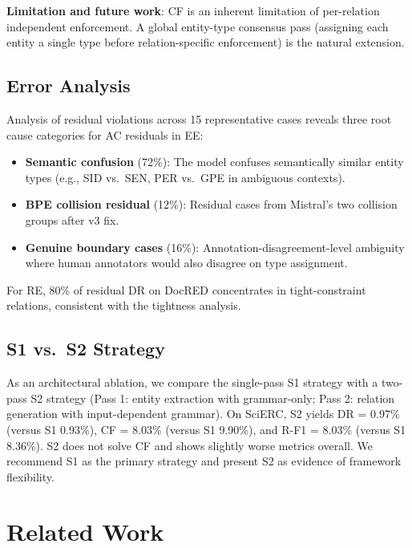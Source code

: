 \documentclass[11pt,a4paper]{article}
\newcommand{\drsym}{\textsc{DR}}
\newcommand{\cfsym}{\textsc{CF}}
\newcommand{\acsym}{\textsc{AC}}
\begin{document}
\textbf{Limitation and future work}: \cfsym{} is an inherent limitation of per-relation independent enforcement. A global entity-type consensus pass (assigning each entity a single type before relation-specific enforcement) is the natural extension.

\subsection{Error Analysis}

Analysis of residual violations across 15 representative cases reveals three root cause categories for \acsym{} residuals in EE:
\begin{itemize}[nosep,leftmargin=*]
\item \textbf{Semantic confusion} (72\%): The model confuses semantically similar entity types (e.g., SID vs.\ SEN, PER vs.\ GPE in ambiguous contexts).
\item \textbf{BPE collision residual} (12\%): Residual cases from Mistral's two collision groups after v3 fix.
\item \textbf{Genuine boundary cases} (16\%): Annotation-disagreement-level ambiguity where human annotators would also disagree on type assignment.
\end{itemize}

For RE, 80\% of residual \drsym{} on DocRED concentrates in tight-constraint relations, consistent with the tightness analysis.

\subsection{S1 vs.\ S2 Strategy}

As an architectural ablation, we compare the single-pass S1 strategy with a two-pass S2 strategy (Pass 1: entity extraction with grammar-only; Pass 2: relation generation with input-dependent grammar). On SciERC, S2 yields \drsym{} = 0.97\% (versus S1 0.93\%), \cfsym{} = 8.03\% (versus S1 9.90\%), and R-F1 = 8.03\% (versus S1 8.36\%). S2 does not solve \cfsym{} and shows slightly worse metrics overall. We recommend S1 as the primary strategy and present S2 as evidence of framework flexibility.

\section{Related Work}
\end{document}
